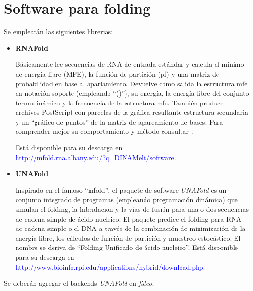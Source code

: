 \documentclass[12pt,a4paper,spanish]{article}
\begin{document}
\section{Software para folding}
Se emplearán las siguientes librerias:
\begin{itemize}
    \item \textbf{RNAFold} 
        \par Básicamente lee secuencias de RNA de entrada estándar y calcula el mínimo de energía libre
        (MFE), la función de partición (pf) y una matriz de probabilidad en base al apariamiento. Devuelve
        como salida la estructura mfe en notación soporte (empleando ``()''), su energía, la energía libre
        del conjunto termodinámico y la frecuencia de la estructura mfe. También produce archivos PostScript
        con parcelas de la gráfica resultante estructura secundaria y un ``gráfico de puntos'' de la matriz
        de apareamiento de bases. Para comprender mejor su comportamiento y método consultar \cite{11}.
        \par Está disponible para su descarga en \\
        \textcolor{blue}{http://mfold.rna.albany.edu/?q=DINAMelt/software.}

    \item \textbf{UNAFold} 
          \par Inspirado en el famoso ``mfold'', el paquete de software \emph{UNAFold}\cite{10} es un conjunto
           integrado de programas (empleando programación dinámica) que simulan el folding, la hibridación y
           la vías de fusión para una o dos secuencias de cadena simple de ácido nucleico. El paquete predice
           el folding para RNA de cadena simple o el DNA a través de la combinación de minimización de la
           energía libre, los cálculos de función de partición y muestreo estocástico. El nombre se deriva de
           ``Folding Unificado de ácido nucleico''.
           Está disponible para su descarga en 
            \textcolor{blue}{http://www.bioinfo.rpi.edu/applications/hybrid/download.php.}
\end{itemize}

Se deberán agregar el backends \emph{UNAFold} en \emph{fideo}.
\end{document}
